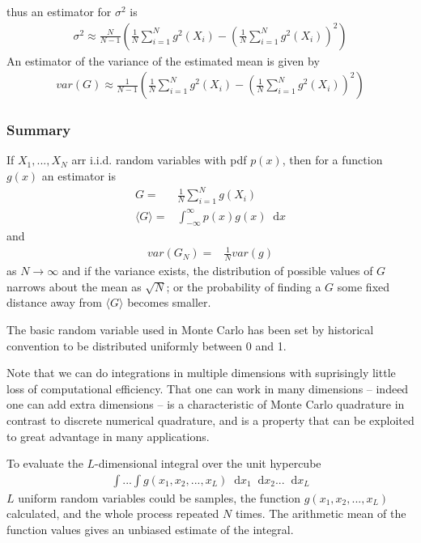 \documentclass[twoside,english]{uiofysmaster}
\newcommand*\dif{\mathop{}\!\mathrm{d}}
\begin{document}
thus an estimator for $\sigma^2$ is
\begin{align}
	\sigma^2 \approx \frac{N}{N-1} ( \frac{1}{N} \sum_{i=1}^N g^2(X_i) -
	( \frac{1}{N} \sum_{i=1}^N g^2(X_i))^2 )
\end{align}
An estimator of the variance of the estimated mean is given by
\begin{align}
	var(G) \approx \frac{1}{N-1} ( \frac{1}{N} \sum_{i=1}^N g^2(X_i) -
	( \frac{1}{N} \sum_{i=1}^N g^2(X_i))^2 )
\end{align}

\subsubsection{Summary}
If $X_1,...,X_N$ arr i.i.d. random variables with pdf $p(x)$, then for a function $g(x)$ an estimator is
\begin{align}
	G =& \frac{1}{N} \sum_{i=1}^N g(X_i) \\
	\langle G \rangle =& \int_{-\infty}^\infty p(x) g(x) \dif x
\end{align}
and
\begin{align}
	var(G_N) =& \frac{1}{N} var(g)
\end{align}
as $N\rightarrow \infty$ and if the variance exists, the distribution of possible values of $G$ narrows about the mean as $\sqrt{N}$; or the probability of finding a $G$ some fixed distance away from $\langle G \rangle$ becomes smaller. 

The basic random variable used in Monte Carlo has been set by historical convention to be distributed uniformly between 0 and 1.

Note that we can do integrations in multiple dimensions with suprisingly little loss of computational efficiency. That one can work in many dimensions – indeed one can add extra dimensions – is a characteristic of Monte Carlo quadrature in contrast to discrete numerical quadrature, and is a property that can be exploited to great advantage in many applications.

To evaluate the $L$-dimensional integral over the unit hypercube 
\begin{align}
	\int ... \int g(x_1, x_2, ..., x_L) \dif x_1 \dif x_2 ... \dif x_L
\end{align}
$L$ uniform random variables could be samples, the function $g(x_1, x_2, ..., x_L)$ calculated, and the whole process repeated $N$ times. The arithmetic mean of the function values gives an unbiased estimate of the integral.
\end{document}
